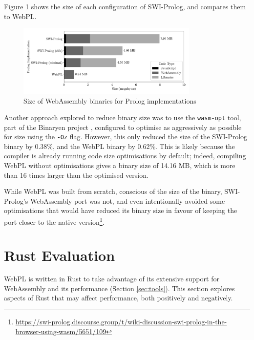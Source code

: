 Figure \ref{fig:binary-size} shows the size of each configuration of SWI-Prolog, and compares them to WebPL.

\begin{figure}[H]
\centering
\includegraphics[width=0.8\textwidth]{binary_size.pdf}
\caption{Size of WebAssembly binaries for Prolog implementations}
\label{fig:binary-size}
\end{figure}

\vspace*{-1.5em}

Another approach explored to reduce binary size was to use the \texttt{wasm-opt} tool, part of the Binaryen project \cite{zakaiBinaryenhttpsgithubcom2015}, configured to optimise as aggressively as possible for size using the \texttt{-Oz} flag. However, this only reduced the size of the SWI-Prolog binary by 0.38\%, and the WebPL binary by 0.62\%. This is likely because the compiler is already running code size optimisations by default; indeed, compiling WebPL without optimisations gives a binary size of 14.16 MB, which is more than 16 times larger than the optimised version.

While WebPL was built from scratch, conscious of the size of the binary, SWI-Prolog's WebAssembly port was not, and even intentionally avoided some optimisations that would have reduced its binary size in favour of keeping the port closer to the native version\footnote{\url{https://swi-prolog.discourse.group/t/wiki-discussion-swi-prolog-in-the-browser-using-wasm/5651/109}}.

\section{Rust Evaluation}

\label{sec:rust-evaluation}

WebPL is written in Rust to take advantage of its extensive support for WebAssembly and its performance (Section \ref{sec:tools}). This section explores aspects of Rust that may affect performance, both positively and negatively.

